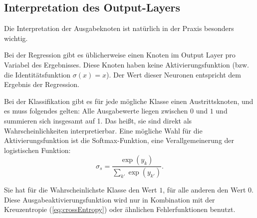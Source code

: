 \subsection{Interpretation des Output-Layers}
Die Interpretation der Ausgabeknoten ist natürlich in der Praxis besonders wichtig.

Bei der Regression gibt es üblicherweise einen Knoten im Output Layer pro Variabel des Ergebnisses. Diese Knoten haben keine Aktivierungsfunktion (bzw. die Identitätsfunktion $\sigma(x) = x$). Der Wert dieser Neuronen entspricht dem Ergebnis der Regression. 

Bei der Klassifikation gibt es für jede mögliche Klasse einen Austrittsknoten, und es muss folgendes gelten:
Alle Ausgabewerte liegen zwischen $0$ und $1$ und summieren sich insgesamt auf 1.
Das heißt, sie sind direkt als Wahrscheinlichkeiten interpretierbar. Eine mögliche Wahl für die Aktivierungsfunktion ist die Softmax-Funktion, eine Verallgemeinerung der logistischen Funktion:
\begin{equation}
\label{eq:softmax}
	\sigma_s = \frac{\exp (y_k)}{\sum_{k'} \exp (y_{k'})}.
\end{equation}

Sie hat für die Wahrscheinlichste Klasse den Wert $1$, für alle anderen den Wert $0$. Diese Ausgabeaktivierungsfunktion wird nur in Kombination mit der Kreuzentropie (\ref{eq:crossEntropy}) oder ähnlichen Fehlerfunktionen benutzt\cite{bishop1995neural}. 
